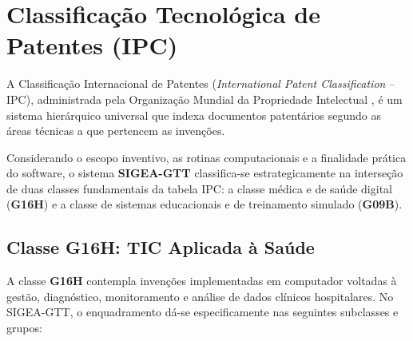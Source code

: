 \chapter{Classificação Tecnológica de Patentes (IPC)}
\label{cap_classificacao_ipc}

A Classificação Internacional de Patentes (\textit{International Patent Classification} -- IPC), administrada pela Organização Mundial da Propriedade Intelectual \cite{wipo2023}, é um sistema hierárquico universal que indexa documentos patentários segundo as áreas técnicas a que pertencem as invenções.

Considerando o escopo inventivo, as rotinas computacionais e a finalidade prática do software, o sistema \textbf{SIGEA-GTT} classifica-se estrategicamente na interseção de duas classes fundamentais da tabela IPC: a classe médica e de saúde digital (\textbf{G16H}) e a classe de sistemas educacionais e de treinamento simulado (\textbf{G09B}).

\section{Classe G16H: TIC Aplicada à Saúde}
\label{sec_classe_g16h}

A classe \textbf{G16H} contempla invenções implementadas em computador voltadas à gestão, diagnóstico, monitoramento e análise de dados clínicos hospitalares. No SIGEA-GTT, o enquadramento dá-se especificamente nas seguintes subclasses e grupos:


